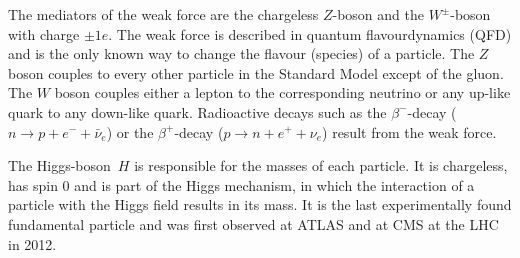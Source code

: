 The mediators of the weak force are the chargeless $Z$-boson and the $W^\pm$-boson with charge $\pm 1e$.
The weak force is described in quantum flavourdynamics (QFD) and is the only known way to change the flavour (species) of a particle.
The $Z$ boson couples to every other particle in the Standard Model except of the gluon.
The $W$ boson couples either a lepton to the corresponding neutrino or any up-like quark to any down-like quark.
Radioactive decays such as the $\beta^-$-decay ($n \rightarrow p + e^- + \bar{\nu}_e$) or the $\beta^+$-decay ($p \rightarrow n + e^+ + \nu_e$) result from the weak force.

The Higgs-boson~$H$ is responsible for the masses of each particle.
It is chargeless, has spin $0$ and is part of the Higgs mechanism, in which the interaction of a particle with the Higgs field results in its mass.
It is the last experimentally found fundamental particle and was first observed at ATLAS and at CMS at the LHC in 2012. \cite{HiggsATLAS,HiggsCMS}

%
